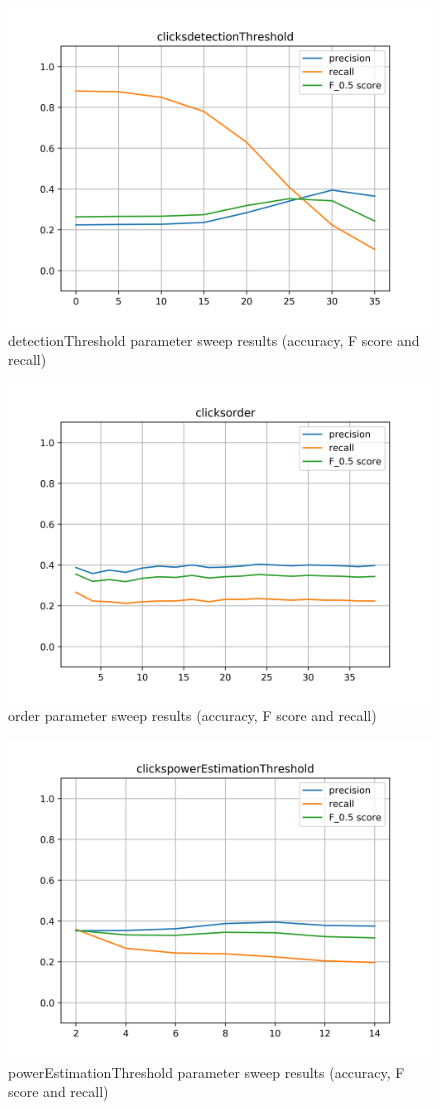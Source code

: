 \begin{figure}[H]
	\includegraphics[clip,width=0.7\columnwidth]{Figures/clicksdetectionThreshold.png}%
	\caption{detectionThreshold parameter sweep results (accuracy, F score and recall)}
	\label{fig:clicksdetectionThreshold}
\end{figure}

\begin{figure}[H]
	\includegraphics[clip,width=0.7\columnwidth]{Figures/clicksorder.png}%
	\caption{order parameter sweep results (accuracy, F score and recall)}
	\label{fig:clicksorder}
\end{figure}

\begin{figure}[H]
	\includegraphics[clip,width=0.7\columnwidth]{Figures/clickspowerEstimationThreshold.png}%
	\caption{powerEstimationThreshold parameter sweep results (accuracy, F score and recall)}
	\label{fig:clickspowerEstimationThreshold}
\end{figure}

